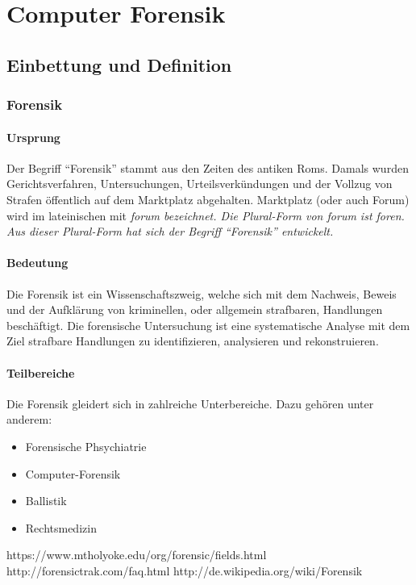 \chapter{Computer Forensik}

\section{Einbettung und Definition}
\subsection{Forensik}
\subsubsection{Ursprung}
Der Begriff "`Forensik"' stammt aus den Zeiten des antiken Roms. Damals wurden Gerichtsverfahren, Untersuchungen, Urteilsverkündungen und der Vollzug von Strafen öffentlich auf dem Marktplatz abgehalten. Marktplatz (oder auch Forum) wird im lateinischen mit \it{forum} bezeichnet. Die Plural-Form von \it{forum} ist \it{foren}. Aus dieser Plural-Form hat sich der Begriff "`Forensik"' entwickelt.

\subsubsection{Bedeutung}
Die Forensik ist ein Wissenschaftszweig, welche sich mit dem Nachweis, Beweis und der Aufklärung von kriminellen, oder allgemein strafbaren, Handlungen beschäftigt. Die forensische Untersuchung ist eine systematische Analyse mit dem Ziel strafbare Handlungen zu identifizieren, analysieren und rekonstruieren.

\subsubsection{Teilbereiche}
Die Forensik gleidert sich in zahlreiche Unterbereiche. Dazu gehören unter anderem: 
\begin{itemize}
\item Forensische Phsychiatrie

\item Computer-Forensik
\item Ballistik
\item Rechtsmedizin
\end{itemize}

https://www.mtholyoke.edu/org/forensic/fields.html
http://forensictrak.com/faq.html
http://de.wikipedia.org/wiki/Forensik


